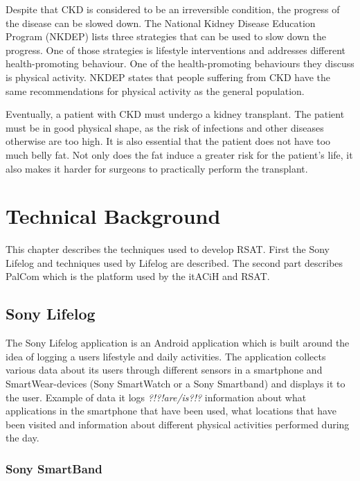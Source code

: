 \documentclass{cslthse-msc}
\begin{document}
Despite that CKD is considered to be an irreversible condition, the progress of the disease can be slowed down. The National Kidney Disease Education Program (NKDEP) lists three strategies that can be used to slow down the progress\cite{NKDEPPROG}. One of those strategies is lifestyle interventions and addresses different health-promoting behaviour. One of the health-promoting behaviours they discuss is physical activity. NKDEP states that people suffering from CKD have the same recommendations for physical activity as the general population. 

Eventually, a patient with CKD must undergo a kidney transplant. The patient must be in good physical shape, as the risk of infections and other diseases otherwise are too high. It is also essential that the patient does not have too much belly fat. Not only does the fat induce a greater risk for the patient's life, it also makes it harder for surgeons to practically perform the transplant. %

\chapter[Technical Background]{Technical Background}

This chapter describes the techniques used to develop RSAT. First the Sony Lifelog and techniques used by Lifelog are described. The second part describes PalCom which is the platform used by the itACiH and RSAT. 

\section{Sony Lifelog}

The Sony Lifelog application is an Android application which is built around the idea of logging a users lifestyle and daily activities\cite{LifeLogDescr}. The application collects various data about its users through different sensors in a smartphone and SmartWear-devices (Sony SmartWatch or a Sony Smartband) and displays it to the user. Example of data it logs \emph{?!?!are/is?!?}  information about what applications in the smartphone that have been used, what locations that have been visited and information about different physical activities performed during the day.  

\subsection{Sony SmartBand}
\end{document}
